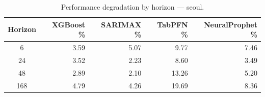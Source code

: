 \begin{table}[h]
\centering
\caption{Performance degradation by horizon — seoul.}
\label{tab:degradation_horizon_seoul}
\begin{tabular}{crrrr}
\toprule
Horizon & XGBoost \% & SARIMAX \% & TabPFN \% & NeuralProphet \% \\
\midrule
6 & 3.59 & 5.07 & 9.77 & 7.46 \\
24 & 3.52 & 2.23 & 8.60 & 3.49 \\
48 & 2.89 & 2.10 & 13.26 & 5.20 \\
168 & 4.79 & 4.26 & 19.69 & 8.36 \\
\bottomrule
\end{tabular}
\end{table}

